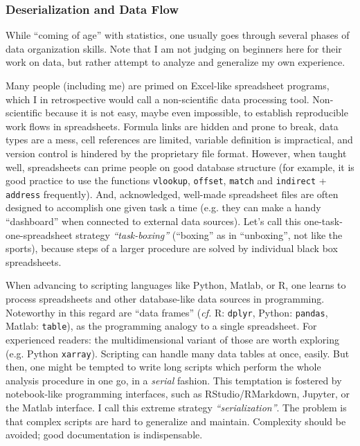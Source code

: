 \subsubsection{Deserialization and Data Flow}
\label{workflow:deserialization}
While ``coming of age'' with statistics, one usually goes through several phases of data organization skills.
Note that I am not judging on beginners here for their work on data, but rather attempt to analyze and generalize my own experience.

Many people (including me) are primed on Excel-like spreadsheet programs, which I in retrospective would call a non-scientific data processing tool.
Non-scientific because it is not easy, maybe even impossible, to establish reproducible work flows in spreadsheets.
Formula links are hidden and prone to break, data types are a mess, cell references are limited, variable definition is impractical, and version control is hindered by the proprietary file format.
However, when taught well, spreadsheets can prime people on good database structure (for example, it is good practice to use the functions \texttt{vlookup}, \texttt{offset}, \texttt{match} and \texttt{indirect} + \texttt{address} frequently).
And, acknowledged, well-made spreadsheet files are often designed to accomplish one given task a time (e.g. they can make a handy ``dashboard'' when connected to external data sources).
Let's call this one-task-one-spreadsheet strategy \emph{``task-boxing''} (``boxing'' as in ``unboxing'', not like the sports), because steps of a larger procedure are solved by individual black box spreadsheets.

When advancing to scripting languages like Python, Matlab, or R, one learns to process spreadsheets and other database-like data sources in programming.
Noteworthy in this regard are ``data frames'' (\emph{cf.} R: \texttt{dplyr}, Python: \texttt{pandas}, Matlab: \texttt{table}), as the programming analogy to a single spreadsheet.
For experienced readers: the multidimensional variant of those are worth exploring (e.g. Python \texttt{xarray}).
Scripting can handle many data tables at once, easily.
But then, one might be tempted to write long scripts which perform the whole analysis procedure in one go, in a \emph{serial} fashion.
This temptation is fostered by notebook-like programming interfaces, such as RStudio/RMarkdown, Jupyter, or the Matlab interface.
I call this extreme strategy \emph{``serialization''}.
The problem is that complex scripts are hard to generalize and maintain.
Complexity should be avoided; good documentation is indispensable.

